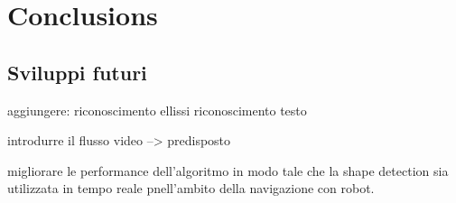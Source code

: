 \chapter{Conclusions}

	\section{Sviluppi futuri}	
	aggiungere:
		riconoscimento ellissi
		riconoscimento testo

		introdurre il flusso video --> predisposto
	
		migliorare le performance dell'algoritmo in modo tale che la shape detection sia utilizzata in tempo reale pnell'ambito della navigazione con robot.
